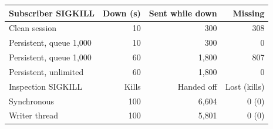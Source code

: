 \begin{tabular}{@{}lrrr@{}}
\toprule
Subscriber SIGKILL & Down (s) & Sent while down & Missing \\
\midrule
Clean session & 10 & 300 & 308 \\
Persistent, queue 1{,}000 & 10 & 300 & 0 \\
Persistent, queue 1{,}000 & 60 & 1{,}800 & 807 \\
Persistent, unlimited & 60 & 1{,}800 & 0 \\
\midrule
Inspection SIGKILL & Kills & Handed off & Lost (kills) \\
\midrule
Synchronous & 100 & 6{,}604 & 0 (0) \\
Writer thread & 100 & 5{,}801 & 0 (0) \\
\bottomrule
\end{tabular}
